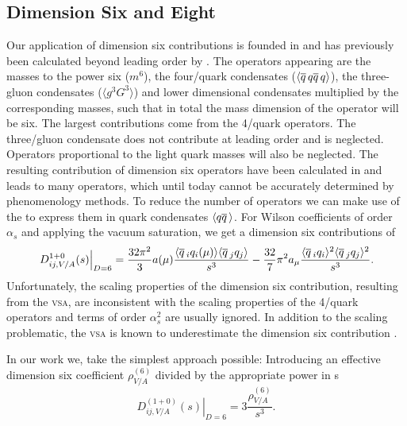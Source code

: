 \documentclass[../../index.tex]{subfiles}
\begin{document}
\subsection{Dimension Six and Eight}
Our application of dimension six contributions is founded in \cite{Braaten1991}
and has previously been calculated beyond leading order by \cite{Lanin1986}. The
operators appearing are the masses to the power six (\(m^6\)), the four\-/quark
condensates (\(\langle \overline{q}\, q \overline{q}\, q \rangle\)), the three-gluon
condensates (\(\langle g^3 G^3 \rangle\)) and lower dimensional condensates
multiplied by the corresponding masses, such that in total the mass dimension of
the operator will be six. The largest contributions come from the 4\-/quark
operators. The three\-/gluon condensate does not contribute at leading order
\cite{Hubschmid1982} and is neglected. Operators proportional to the light quark
masses will also be neglected. The resulting contribution of dimension six
operators have been calculated in \cite{Lanin1986} and leads to many operators,
which until today cannot be accurately determined by phenomenology methods. To
reduce the number of operators we can make use of the  \cite{Beneke2008,Braaten1991,Shifman1978} to express them
in quark condensates \(\langle q \overline{q}\, \rangle\). For Wilson coefficients of
order \(\alpha_s\) and applying the vacuum saturation, we get a dimension six
contributions of
\begin{equation}
  \left. D_{ij,V/A}^{1+0}(s) \right\vert_{D=6} = \frac{32\pi^2}{3} a(\mu) \frac{\langle \overline{q}\,_iq_i(\mu) \rangle\langle \overline{q}\,_jq_j \rangle}{s^3}
  - \frac{32}{7} \pi^2 a_\mu \frac{\langle \overline{q}\,_i q_i \rangle^2 \langle \overline{q}\,_j q_j \rangle^2}{s^3}.
\end{equation}
Unfortunately, the scaling properties of the dimension six contribution,
resulting from the \textsc{vsa}, are inconsistent with the scaling properties of
the 4\-/quark operators \cite{Narison1983,Jamin1985} and terms of order
\(\alpha_s^2\) are usually ignored. In addition to the scaling problematic, the
\textsc{vsa} is known to underestimate the dimension six contribution
\cite{Launer1983}.

In our work we, take the simplest approach possible: Introducing an effective
dimension six coefficient \(\rho_{V/A}^{(6)}\) divided by the appropriate power
in s
\begin{equation}
  \left. D_{ij,V/A}^{(1+0)}(s) \right\rvert_{D=6} = 3 \frac{\rho_{V/A}^{(6)}}{s^3}.
\end{equation}
\end{document}
